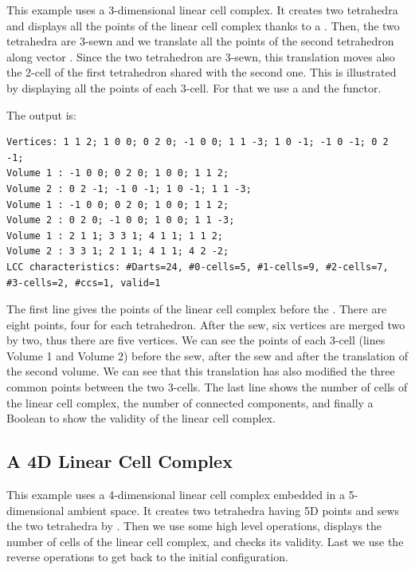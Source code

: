 This example uses a 3-dimensional linear cell complex. It creates two
tetrahedra and displays all the points of the linear cell complex
thanks to a . Then, the two
tetrahedra are 3-sewn and we translate all the points of the second
tetrahedron along vector .  Since the two tetrahedron
are 3-sewn, this translation moves also the 2-cell of the first
tetrahedron shared with the second one.  This is illustrated by
displaying all the points of each 3-cell. For that we use a
 and the  functor.


The output is:
\begin{verbatim}
Vertices: 1 1 2; 1 0 0; 0 2 0; -1 0 0; 1 1 -3; 1 0 -1; -1 0 -1; 0 2 -1; 
Volume 1 : -1 0 0; 0 2 0; 1 0 0; 1 1 2; 
Volume 2 : 0 2 -1; -1 0 -1; 1 0 -1; 1 1 -3; 
Volume 1 : -1 0 0; 0 2 0; 1 0 0; 1 1 2; 
Volume 2 : 0 2 0; -1 0 0; 1 0 0; 1 1 -3; 
Volume 1 : 2 1 1; 3 3 1; 4 1 1; 1 1 2; 
Volume 2 : 3 3 1; 2 1 1; 4 1 1; 4 2 -2; 
LCC characteristics: #Darts=24, #0-cells=5, #1-cells=9, #2-cells=7, #3-cells=2, #ccs=1, valid=1
\end{verbatim}

The first line gives the points of the linear cell complex before the
. There are eight points, four for each tetrahedron.
After the sew, six vertices are merged two by two, thus there are five
vertices. We can see the points of each 3-cell (lines Volume 1 and
Volume 2) before the sew, after the sew and after the translation of
the second volume.  We can see that this translation has also modified
the three common points between the two 3-cells.  The last line shows
the number of cells of the linear cell complex, the number of
connected components, and finally a Boolean to show the validity of
the linear cell complex.

\subsection{A 4D Linear Cell Complex}\label{ssec-5dexample}

This example uses a 4-dimensional linear cell complex embedded in a
5-dimensional ambient space.  It creates two tetrahedra having 5D
points and sews the two tetrahedra by \betaquatre{}. Then we use some high
level operations, displays the number of cells of the linear cell
complex, and checks its validity.  Last we use the reverse operations
to get back to the initial configuration.

